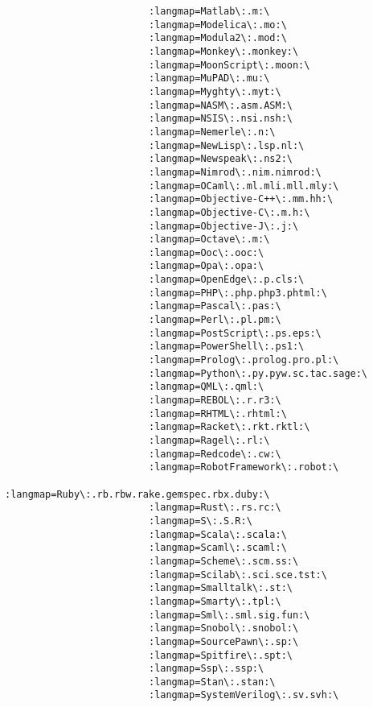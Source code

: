 \documentclass[11pt]{article}
\begin{document}
\begin{lstlisting}
                         :langmap=Matlab\:.m:\
                         :langmap=Modelica\:.mo:\
                         :langmap=Modula2\:.mod:\
                         :langmap=Monkey\:.monkey:\
                         :langmap=MoonScript\:.moon:\
                         :langmap=MuPAD\:.mu:\
                         :langmap=Myghty\:.myt:\
                         :langmap=NASM\:.asm.ASM:\
                         :langmap=NSIS\:.nsi.nsh:\
                         :langmap=Nemerle\:.n:\
                         :langmap=NewLisp\:.lsp.nl:\
                         :langmap=Newspeak\:.ns2:\
                         :langmap=Nimrod\:.nim.nimrod:\
                         :langmap=OCaml\:.ml.mli.mll.mly:\
                         :langmap=Objective-C++\:.mm.hh:\
                         :langmap=Objective-C\:.m.h:\
                         :langmap=Objective-J\:.j:\
                         :langmap=Octave\:.m:\
                         :langmap=Ooc\:.ooc:\
                         :langmap=Opa\:.opa:\
                         :langmap=OpenEdge\:.p.cls:\
                         :langmap=PHP\:.php.php3.phtml:\
                         :langmap=Pascal\:.pas:\
                         :langmap=Perl\:.pl.pm:\
                         :langmap=PostScript\:.ps.eps:\
                         :langmap=PowerShell\:.ps1:\
                         :langmap=Prolog\:.prolog.pro.pl:\
                         :langmap=Python\:.py.pyw.sc.tac.sage:\
                         :langmap=QML\:.qml:\
                         :langmap=REBOL\:.r.r3:\
                         :langmap=RHTML\:.rhtml:\
                         :langmap=Racket\:.rkt.rktl:\
                         :langmap=Ragel\:.rl:\
                         :langmap=Redcode\:.cw:\
                         :langmap=RobotFramework\:.robot:\
                         :langmap=Ruby\:.rb.rbw.rake.gemspec.rbx.duby:\
                         :langmap=Rust\:.rs.rc:\
                         :langmap=S\:.S.R:\
                         :langmap=Scala\:.scala:\
                         :langmap=Scaml\:.scaml:\
                         :langmap=Scheme\:.scm.ss:\
                         :langmap=Scilab\:.sci.sce.tst:\
                         :langmap=Smalltalk\:.st:\
                         :langmap=Smarty\:.tpl:\
                         :langmap=Sml\:.sml.sig.fun:\
                         :langmap=Snobol\:.snobol:\
                         :langmap=SourcePawn\:.sp:\
                         :langmap=Spitfire\:.spt:\
                         :langmap=Ssp\:.ssp:\
                         :langmap=Stan\:.stan:\
                         :langmap=SystemVerilog\:.sv.svh:\

\end{lstlisting}
\end{document}
